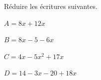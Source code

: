 \documentclass[a4paper]{book}
\begin{document}
    \begin{exemple}
        Réduire les écritures suivantes.

        \medskip
        
        \begin{minipage}{0.24\linewidth}
            $A=8x+12x$

            \vspace{2cm}
        \end{minipage}
        \hfill\vline\hfill
        \begin{minipage}{0.24\linewidth}
            $B=8x-5-6x$

            \vspace{2cm}
        \end{minipage}
        \hfill\vline\hfill
        \begin{minipage}{0.24\linewidth}
            $C=4x-5x^2+17x$

            \vspace{2cm}
        \end{minipage}
        \hfill\vline\hfill
        \begin{minipage}{0.24\linewidth}
            $D=14-3x-20+18x$

            \vspace{2cm}
        \end{minipage}
    \end{exemple}
    


        
    
\end{document}
